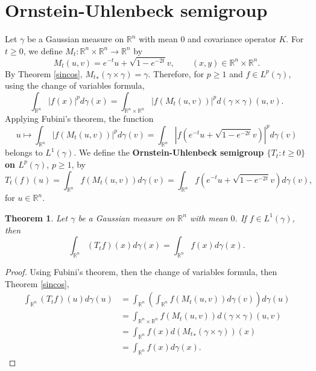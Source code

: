 \documentclass{article}
\newtheorem{theorem}{Theorem}
\theoremstyle{definition}
\begin{document}
\section{Ornstein-Uhlenbeck semigroup}
Let $\gamma$ be a Gaussian measure on $\mathbb{R}^n$ with mean $0$ and covariance operator
$K$. 
For $t \geq 0$, we define $M_t:\mathbb{R}^n \times \mathbb{R}^n \to \mathbb{R}^n$ by
\[
M_t(u,v) = e^{-t} u + \sqrt{1-e^{-2t}}v, \qquad (x,y) \in \mathbb{R}^n \times \mathbb{R}^n.
\]
By Theorem \ref{sincos}, ${M_t}_*(\gamma \times \gamma)=\gamma$. 
Therefore, for $p \geq 1$ and $f \in L^p(\gamma)$, using the change of variables formula,
\[
\int_{\mathbb{R}^n} |f(x)|^p d\gamma(x)=\int_{\mathbb{R}^n \times \mathbb{R}^n}
|f(M_t(u,v))|^p d(\gamma \times \gamma)(u,v).
\]
Applying Fubini's theorem, the function
\[
u \mapsto \int_{\mathbb{R}^n} |f(M_t(u,v))|^p d\gamma(v)
=\int_{\mathbb{R}^n} |f(e^{-t} u + \sqrt{1-e^{-2t}}v)|^p d\gamma(v)
\]
belongs to $L^1(\gamma)$. 
We define the \textbf{Ornstein-Uhlenbeck semigroup $\{T_t: t \geq 0\}$
on $L^p(\gamma)$}, $p \geq 1$, by
\[
T_t(f)(u) =
\int_{\mathbb{R}^n} f(M_t(u,v)) d\gamma(v)
= \int_{\mathbb{R}^n} f\left(e^{-t}u+\sqrt{1-e^{-2t}}v\right) d\gamma(v),
\]
for $u \in \mathbb{R}^n$. 


\begin{theorem}
Let $\gamma$ be a Gaussian measure on
$\mathbb{R}^n$ with mean $0$.
If $f \in L^1(\gamma)$, then
\[
\int_{\mathbb{R}^n} (T_t f)(x) d\gamma(x)
=\int_{\mathbb{R}^n} f(x) d\gamma(x).
\]
\label{invariant}
\end{theorem}
\begin{proof}
Using Fubini's theorem, then
the change of variables formula, then  Theorem \ref{sincos}, 
\begin{align*}
\int_{\mathbb{R}^n} (T_t f)(u) d\gamma(u) &=
\int_{\mathbb{R}^n} \left(\int_{\mathbb{R}^n} f(M_t(u,v)) d\gamma(v)\right)
d\gamma(u)\\
&=\int_{\mathbb{R}^n \times\mathbb{R}^n} f(M_t(u,v)) d(\gamma \times \gamma)(u,v)\\
&=\int_{\mathbb{R}^n} f(x) d({M_t}_*(\gamma \times \gamma))(x)\\
&=\int_{\mathbb{R}^n} f(x) d\gamma(x).
\end{align*}
\end{proof}
\end{document}

